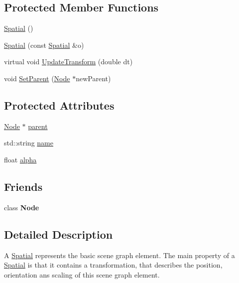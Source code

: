 \subsection*{Protected Member Functions}
\begin{DoxyCompactItemize}
\item 
\hyperlink{classastu_1_1suite2d_1_1Spatial_a5b989b593ce75f86c1c12059b22ec350}{Spatial} ()
\item 
\hyperlink{classastu_1_1suite2d_1_1Spatial_af05646464cc9dcf5add392d13dd55e3a}{Spatial} (const \hyperlink{classastu_1_1suite2d_1_1Spatial}{Spatial} \&o)
\item 
virtual void \hyperlink{classastu_1_1suite2d_1_1Spatial_a9c612ec47fd9d621aca423822b2b6132}{Update\+Transform} (double dt)
\item 
void \hyperlink{classastu_1_1suite2d_1_1Spatial_ab3772e36188589159bc76bcbaf3dd828}{Set\+Parent} (\hyperlink{classastu_1_1suite2d_1_1Node}{Node} $\ast$new\+Parent)
\end{DoxyCompactItemize}
\subsection*{Protected Attributes}
\begin{DoxyCompactItemize}
\item 
\hyperlink{classastu_1_1suite2d_1_1Node}{Node} $\ast$ \hyperlink{classastu_1_1suite2d_1_1Spatial_a5437ad18bb6b8752711ee229bafe6f46}{parent}
\item 
std\+::string \hyperlink{classastu_1_1suite2d_1_1Spatial_af317fff32a847e427f675d564a17e65a}{name}
\item 
float \hyperlink{classastu_1_1suite2d_1_1Spatial_a8aedfdadbece638bf283d4ba232c6928}{alpha}
\end{DoxyCompactItemize}
\subsection*{Friends}
\begin{DoxyCompactItemize}
\item 
\mbox{\label{classastu_1_1suite2d_1_1Spatial_a6db9d28bd448a131448276ee03de1e6d}} 
class {\bfseries Node}
\end{DoxyCompactItemize}


\subsection{Detailed Description}
A \hyperlink{classastu_1_1suite2d_1_1Spatial}{Spatial} represents the basic scene graph element. The main property of a \hyperlink{classastu_1_1suite2d_1_1Spatial}{Spatial} is that it contains a transformation, that describes the position, orientation ans scaling of this scene graph element. 

